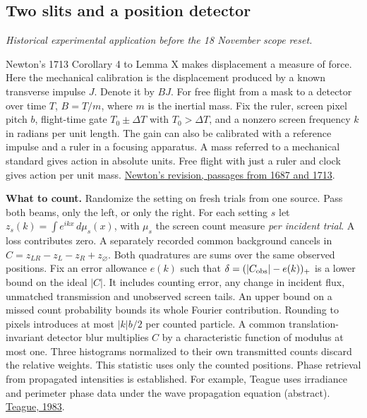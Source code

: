 \documentclass[11pt,a4paper]{article}
\begin{document}
\subsection{Two slits and a position
detector}\label{two-slits-and-a-position-detector}

\emph{Historical experimental application before the 18 November scope
reset.}

Newton's 1713 Corollary 4 to Lemma X makes displacement a measure of
force. Here the mechanical calibration is the displacement produced by a
known transverse impulse \(J\). Denote it by \(BJ\). For free flight
from a mask to a detector over time \(T\), \(B=T/m\), where \(m\) is the
inertial mass. Fix the ruler, screen pixel pitch \(b\), flight-time gate
\(T_0\pm\Delta T\) with \(T_0>\Delta T\), and a nonzero screen frequency
\(k\) in radians per unit length. The gain can also be calibrated with a
reference impulse and a ruler in a focusing apparatus. A mass referred
to a mechanical standard gives action in absolute units. Free flight
with just a ruler and clock gives action per unit mass.
\href{newton-insertion-action.md\#lemma-x-and-the-measurement-of-initial-force}{Newton's
revision, passages from 1687 and 1713}.

\textbf{What to count.} Randomize the setting on fresh trials from one
source. Pass both beams, only the left, or only the right. For each
setting \(s\) let \(z_s(k)=\int e^{ikx}\,d\mu_s(x)\), with \(\mu_s\) the
screen count measure \emph{per incident trial}. A loss contributes zero.
A separately recorded common background cancels in
\(C=z_{LR}-z_L-z_R+z_{\varnothing}\). Both quadratures are sums over the
same observed positions. Fix an error allowance \(e(k)\) such that
\(\delta=(|C_{\rm obs}|-e(k))_+\) is a lower bound on the ideal \(|C|\).
It includes counting error, any change in incident flux, unmatched
transmission and unobserved screen tails. An upper bound on a missed
count probability bounds its whole Fourier contribution. Rounding to
pixels introduces at most \(|k|b/2\) per counted particle. A common
translation-invariant detector blur multiplies \(C\) by a characteristic
function of modulus at most one. Three histograms normalized to their
own transmitted counts discard the relative weights. This statistic uses
only the counted positions. Phase retrieval from propagated intensities
is established. For example, Teague uses irradiance and perimeter phase
data under the wave propagation equation (abstract).
\href{https://doi.org/10.1364/JOSA.73.001434}{Teague, 1983}.
\end{document}

